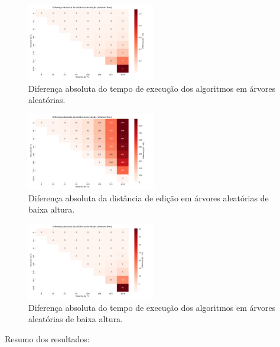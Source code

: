 \documentclass{sbc2023}%
\begin{document}
\begin{figure}[htbp]
    \centering
    \includegraphics[width=0.5\textwidth]{images/heatmap_diff_time_taken_random_tree.png}
    \caption{ Diferença absoluta do tempo de execução dos algoritmos em árvores aleatórias. }
    \label{fig:exemplo}
\end{figure}


\begin{figure}[htbp]
    \centering
    \includegraphics[width=0.5\textwidth]{images/heatmap_diff_edit_distance_shallow_tree.png}
    \caption{ Diferença absoluta da distância de edição em árvores aleatórias de baixa altura. }
    \label{fig:exemplo}
\end{figure}

\begin{figure}[htbp]
    \centering
    \includegraphics[width=0.5\textwidth]{images/heatmap_diff_time_taken_shallow_tree.png}
    \caption{ Diferença absoluta do tempo de execução dos algoritmos em árvores aleatórias de baixa altura. }
    \label{fig:exemplo}
\end{figure}

Resumo dos resultados:
\end{document}
